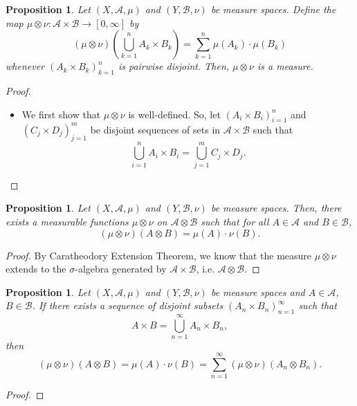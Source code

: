 \documentclass[a4paper, openany]{memoir}
\theoremstyle{definition}
\theoremstyle{plain}
\newtheorem{proposition}[definition]{Proposition}
\begin{document}
    \begin{proposition}
        Let $(X, \mathcal{A}, \mu)$ and $(Y, \mathcal{B}, \nu)$ be measure spaces. Define the map $\mu \otimes \nu \colon \mathcal{A} \times \mathcal{B} \to [0, \infty]$ by
        \[(\mu \otimes \nu) \left(\bigcup_{k=1}^n A_k \times B_k\right) = \sum_{k=1}^n \mu(A_k) \cdot \mu(B_k)\]
        whenever $(A_k \times B_k)_{k=1}^n$ is pairwise disjoint. Then, $\mu \otimes \nu$ is a measure.
    \end{proposition}
    \begin{proof}
        \hspace*{0pt}
        \begin{itemize}
            \item We first show that $\mu \otimes \nu$ is well-defined. So, let $(A_i \times B_i)_{i=1}^n$ and $(C_j \times D_j)_{j=1}^m$ be disjoint sequences of sets in $\mathcal{A} \times \mathcal{B}$ such that
            \[\bigcup_{i=1}^n A_i \times B_i = \bigcup_{j=1}^m C_j \times D_j.\]
        \end{itemize}
    \end{proof}

    \begin{proposition}
        Let $(X, \mathcal{A}, \mu)$ and $(Y, \mathcal{B}, \nu)$ be measure spaces. Then, there exists a measurable functions $\mu \otimes \nu$ on $\mathcal{A} \otimes \mathcal{B}$ such that for all $A \in \mathcal{A}$ and $B \in \mathcal{B}$,
        \[(\mu \otimes \nu)(A \otimes B) = \mu(A) \cdot \nu(B).\]
    \end{proposition}
    \begin{proof}
        By Caratheodory Extension Theorem, we know that the measure $\mu \otimes \nu$ extends to the $\sigma$-algebra generated by $\mathcal{A} \times \mathcal{B}$, i.e. $\mathcal{A} \otimes \mathcal{B}$.
    \end{proof}

    \begin{proposition}
        Let $(X, \mathcal{A}, \mu)$ and $(Y, \mathcal{B}, \nu)$ be measure spaces and $A \in \mathcal{A}$, $B \in \mathcal{B}$. If there exists a sequence of disjoint subsets $(A_n \times B_n)_{n=1}^\infty$ such that
        \[A \times B = \bigcup_{n=1}^\infty A_n \times B_n,\]
        then
        \[(\mu \otimes \nu)(A \otimes B) = \mu(A) \cdot \nu(B) = \sum_{n=1}^\infty (\mu \otimes \nu) (A_n \otimes B_n).\]
    \end{proposition}
    \begin{proof}
        
    \end{proof}
\end{document}
